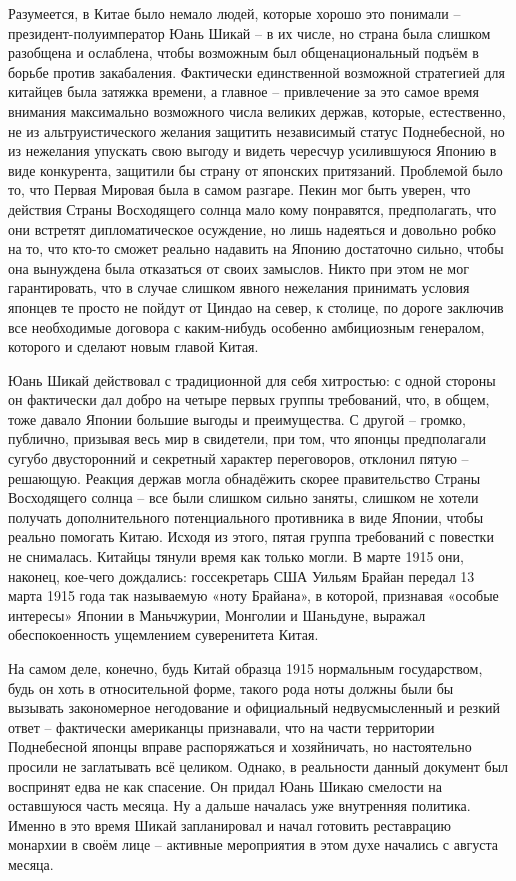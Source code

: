 Разумеется, в Китае было немало людей, которые хорошо это понимали – президент-полуимператор Юань Шикай – в их числе, но страна была слишком разобщена и ослаблена, чтобы возможным был общенациональный подъём в борьбе против закабаления. Фактически единственной возможной стратегией для китайцев была затяжка времени, а главное – привлечение за это самое время внимания максимально возможного числа великих держав, которые, естественно, не из альтруистического желания защитить независимый статус Поднебесной, но из нежелания упускать свою выгоду и видеть чересчур усилившуюся Японию в виде конкурента, защитили бы страну от японских притязаний. Проблемой было то, что Первая Мировая была в самом разгаре. Пекин мог быть уверен, что действия Страны Восходящего солнца мало кому понравятся, предполагать, что они встретят дипломатическое осуждение, но лишь надеяться и довольно робко на то, что кто-то сможет реально надавить на Японию достаточно сильно, чтобы она вынуждена была отказаться от своих замыслов. Никто при этом не мог гарантировать, что в случае слишком явного нежелания принимать условия японцев те просто не пойдут от Циндао на север, к столице, по дороге заключив все необходимые договора с каким-нибудь особенно амбициозным генералом, которого и сделают новым главой Китая.

Юань Шикай действовал с традиционной для себя хитростью: с одной стороны он фактически дал добро на четыре первых группы требований, что, в общем, тоже давало Японии большие выгоды и преимущества. С другой – громко, публично, призывая весь мир в свидетели, при том, что японцы предполагали сугубо двусторонний и секретный характер переговоров, отклонил пятую – решающую. Реакция держав могла обнадёжить скорее правительство Страны Восходящего солнца – все были слишком сильно заняты, слишком не хотели получать дополнительного потенциального противника в виде Японии, чтобы реально помогать Китаю. Исходя из этого, пятая группа требований с повестки не снималась. Китайцы тянули время как только могли. В марте 1915 они, наконец, кое-чего дождались: госсекретарь США Уильям Брайан передал 13 марта 1915 года так называемую «ноту Брайана», в которой, признавая «особые интересы» Японии в Маньчжурии, Монголии и Шаньдуне, выражал обеспокоенность ущемлением суверенитета Китая.

На самом деле, конечно, будь Китай образца 1915 нормальным государством, будь он хоть в относительной форме, такого рода ноты должны были бы вызывать закономерное негодование и официальный недвусмысленный и резкий ответ – фактически американцы признавали, что на части территории Поднебесной японцы вправе распоряжаться и хозяйничать, но настоятельно просили не заглатывать всё целиком. Однако, в реальности данный документ был воспринят едва не как спасение. Он придал Юань Шикаю смелости на оставшуюся часть месяца. Ну а дальше началась уже внутренняя политика. Именно в это время Шикай запланировал и начал готовить реставрацию монархии в своём лице – активные мероприятия в этом духе начались с августа месяца. 

